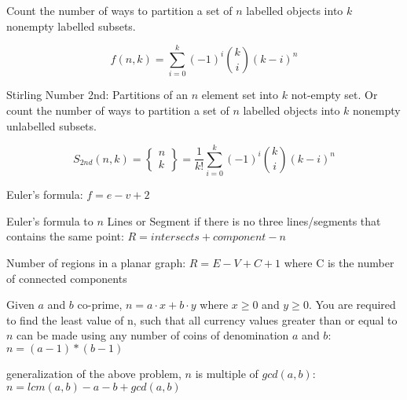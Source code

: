 Count the number of ways to partition a set of $n$ labelled objects into $k$ nonempty labelled subsets.

$$f(n, k) = \sum_{i=0}^{k}(-1)^i\binom{k}{i}(k-i)^n$$

Stirling Number 2nd: Partitions of an $n$ element set into $k$ not-empty set. 
Or count the number of ways to partition a set of $n$ labelled objects into $k$ nonempty unlabelled subsets.

$$S_{2nd}(n, k) = \begin{Bmatrix} n \\ k \end{Bmatrix} = \frac{1}{k!}\sum_{i=0}^{k}(-1)^i\binom{k}{i}(k-i)^n$$

Euler's formula: $f = e - v + 2$

Euler's formula to $n$ Lines or Segment if there is no three lines/segments that contains the same point: $R = intersects + component - n$

Number of regions in a planar graph: $R = E - V + C + 1$ where C is the number of connected components

Given $a$ and $b$ co-prime, $n = a \cdot x + b \cdot y$ where $x \ge 0$ and $y \ge 0$. 
You are required to find the least value of n, such that all currency values greater than or equal to $n$ can be made using any number of coins of denomination $a$ and $b$: $n = (a-1)*(b-1)$

generalization of the above problem, $n$ is multiple of $gcd(a, b)$: $n = lcm(a, b) - a - b + gcd(a, b)$